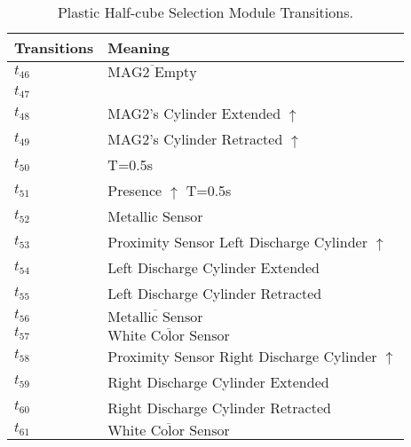 \begin{table}[H]
\caption{Plastic Half-cube Selection Module Transitions.}
\centering
\begin{tabular}{M{5cm}M{10cm}}
Transitions & Meaning\\
\hline
\hyperlink{partialNet:t46}{\hypertarget{partialTable:t46}{$t_{46}$}} & \(\overline{\mbox{MAG2 Empty}}\)\\
\hyperlink{partialNet:t47}{\hypertarget{partialTable:t47}{$t_{47}$}} & \\
\hyperlink{partialNet:t48}{\hypertarget{partialTable:t48}{$t_{48}$}} & MAG2's Cylinder Extended \(\uparrow\)\\
\hyperlink{partialNet:t49}{\hypertarget{partialTable:t49}{$t_{49}$}} & MAG2's Cylinder Retracted \(\uparrow\)\\
\hyperlink{partialNet:tt50}{\hypertarget{partialTable:tt50}{$t_{50}$}} & T=0.5s\\
\hyperlink{partialNet:tt51}{\hypertarget{partialTable:tt51}{$t_{51}$}} & Presence \(\uparrow\) T=0.5s\\
\hyperlink{partialNet:t52}{\hypertarget{partialTable:t52}{$t_{52}$}} & Metallic Sensor\\
\hyperlink{partialNet:t53}{\hypertarget{partialTable:t53}{$t_{53}$}} & Proximity Sensor Left Discharge Cylinder \(\uparrow\)\\
\hyperlink{partialNet:t54}{\hypertarget{partialTable:t54}{$t_{54}$}} & Left Discharge Cylinder Extended\\
\hyperlink{partialNet:t55}{\hypertarget{partialTable:t55}{$t_{55}$}} & Left Discharge Cylinder Retracted\\
\hyperlink{partialNet:t56}{\hypertarget{partialTable:t56}{$t_{56}$}} & \(\overline{\mbox{Metallic Sensor}}\)\\
\hyperlink{partialNet:t57}{\hypertarget{partialTable:t57}{$t_{57}$}} & \(\overline{\mbox{White Color Sensor}}\)\\
\hyperlink{partialNet:t58}{\hypertarget{partialTable:t58}{$t_{58}$}} & Proximity Sensor Right Discharge Cylinder \(\uparrow\)\\
\hyperlink{partialNet:t59}{\hypertarget{partialTable:t59}{$t_{59}$}} & Right Discharge Cylinder Extended\\
\hyperlink{partialNet:t60}{\hypertarget{partialTable:t60}{$t_{60}$}} & Right Discharge Cylinder Retracted\\
\hyperlink{partialNet:t61}{\hypertarget{partialTable:t61}{$t_{61}$}} & \(\overline{\mbox{White Color Sensor}}\)\\

\end{tabular}
\end{table}
